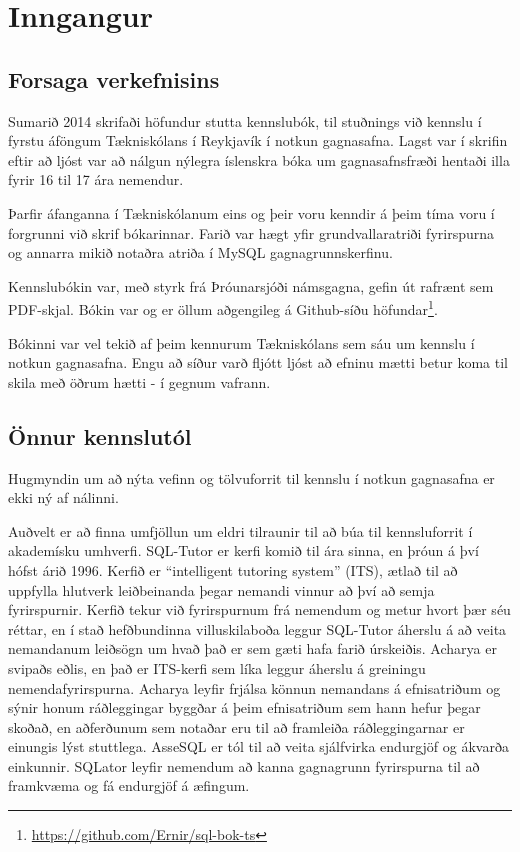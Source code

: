 \documentclass[a4paper,12pt,twoside,BCOR=10mm]{scrbook}
\begin{document}
\chapter{Inngangur}

\setcounter{page}{1}

\section{Forsaga verkefnisins}
Sumarið 2014 skrifaði höfundur stutta kennslubók, til stuðnings við kennslu í fyrstu áföngum Tækniskólans í Reykjavík í notkun gagnasafna. Lagst var í skrifin eftir að ljóst var að nálgun nýlegra íslenskra bóka um gagnasafnsfræði\cite{sigurdur2003, jon2008} hentaði illa fyrir 16 til 17 ára nemendur.

Þarfir áfanganna í Tækniskólanum eins og þeir voru kenndir á þeim tíma voru í forgrunni við skrif bókarinnar. Farið var hægt yfir grundvallaratriði fyrirspurna og annarra mikið notaðra atriða í MySQL gagnagrunnskerfinu.

Kennslubókin var, með styrk frá Þróunarsjóði námsgagna, gefin út rafrænt sem PDF-skjal. Bókin var og er öllum aðgengileg á Github-síðu höfundar\footnote{\url{https://github.com/Ernir/sql-bok-ts}}. 

Bókinni var vel tekið af þeim kennurum Tækniskólans sem sáu um kennslu í notkun gagnasafna. Engu að síður varð fljótt ljóst að efninu mætti betur koma til skila með öðrum hætti - í gegnum vafrann.
\section{Önnur kennslutól}
Hugmyndin um að nýta vefinn og tölvuforrit til kennslu í notkun gagnasafna er ekki ný af nálinni. 

Auðvelt er að finna umfjöllun um eldri tilraunir til að búa til kennsluforrit í akademísku umhverfi. SQL-Tutor \cite{mitrovic1998} er kerfi komið til ára sinna, en þróun á því hófst árið 1996. Kerfið er ``intelligent tutoring system'' (ITS), ætlað til að uppfylla hlutverk leiðbeinanda þegar nemandi vinnur að því að semja fyrirspurnir. Kerfið tekur við fyrirspurnum frá nemendum og metur hvort þær séu réttar, en í stað hefðbundinna villuskilaboða leggur SQL-Tutor áherslu á að veita nemandanum leiðsögn um hvað það er sem gæti hafa farið úrskeiðis. Acharya\cite{bhagat2002} er svipaðs eðlis, en það er ITS-kerfi sem líka leggur áherslu á greiningu nemendafyrirspurna. Acharya leyfir frjálsa könnun nemandans á efnisatriðum og sýnir honum ráðleggingar byggðar á þeim efnisatriðum sem hann hefur þegar skoðað, en aðferðunum sem notaðar eru til að framleiða ráðleggingarnar er einungis lýst stuttlega. AsseSQL \cite{prior2014assesql} er tól til að veita sjálfvirka endurgjöf og ákvarða einkunnir. SQLator \cite{sadiq2004sqlator} leyfir nemendum að kanna gagnagrunn fyrirspurna til að framkvæma og fá endurgjöf á æfingum.
\end{document}
